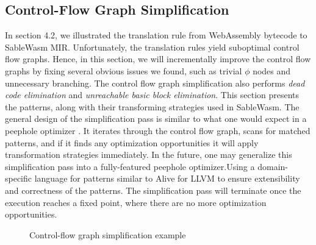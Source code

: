 \subsection{Control-Flow Graph Simplification}

In section 4.2, we illustrated the translation rule from WebAssembly bytecode to
SableWasm MIR. Unfortunately, the translation rules yield suboptimal control
flow graphs. Hence, in this section, we will incrementally improve the control
flow graphs by fixing several obvious issues we found, such as trivial $\phi$
nodes and unnecessary branching. The control flow graph simplification also
performs \emph{dead code elimination} and \emph{unreachable basic block
    elimination}. This section presents the patterns, along with their
transforming strategies used in SableWasm. The general design of the
simplification pass is similar to what one would expect in a peephole optimizer
\cite{peephole-opt}. It iterates through the control flow graph, scans for
matched patterns, and if it finds any optimization opportunities it will apply
transformation strategies immediately. In the future, one may generalize this
simplification pass into a fully-featured peephole optimizer.Using a
domain-specific language for patterns similar to Alive
\cite{alive, alive-in-lean} for LLVM to ensure extensibility and correctness of
the patterns. The simplification pass will terminate once the execution reaches
a fixed point, where there are no more optimization opportunities.

\begin{figure}
    \begin{minipage}[t]{.5\textwidth}
        
    \end{minipage}\hfill
    \begin{minipage}[t]{.5\textwidth}
        
    \end{minipage}
    \caption{Control-flow graph simplification example}
    \label{fig:simplify-example}
\end{figure}

